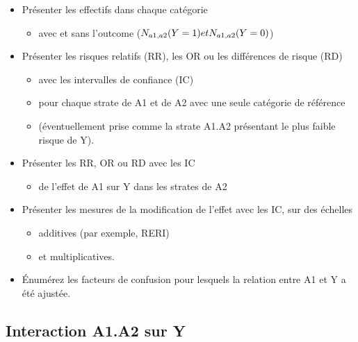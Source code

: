 \documentclass[
]{book}
\providecommand{\tightlist}{%
  \setlength{\itemsep}{0pt}\setlength{\parskip}{0pt}}
\begin{document}
\begin{itemize}
\tightlist
\item
  Présenter les effectifs dans chaque catégorie

  \begin{itemize}
  \tightlist
  \item
    avec et sans l'outcome (\(\small N_{a1,a2}(Y=1) et N_{a1,a2}(Y=0)\))
  \end{itemize}
\item
  Présenter les risques relatifs (RR), les OR ou les différences de risque (RD)

  \begin{itemize}
  \tightlist
  \item
    avec les intervalles de confiance (IC)
  \item
    pour chaque strate de A1 et de A2 avec une seule catégorie de référence
  \item
    (éventuellement prise comme la strate A1.A2 présentant le plus faible risque de Y).
  \end{itemize}
\item
  Présenter les RR, OR ou RD avec les IC

  \begin{itemize}
  \tightlist
  \item
    de l'effet de A1 sur Y dans les strates de A2
  \end{itemize}
\item
  Présenter les mesures de la modification de l'effet avec les IC, sur des échelles

  \begin{itemize}
  \tightlist
  \item
    additives (par exemple, RERI)
  \item
    et multiplicatives.
  \end{itemize}
\item
  Énumérez les facteurs de confusion pour lesquels la relation entre A1 et Y a été ajustée.
\end{itemize}

\hypertarget{interaction-a1.a2-sur-y}{%
\subsection*{Interaction A1.A2 sur Y}\label{interaction-a1.a2-sur-y}}
\end{document}
